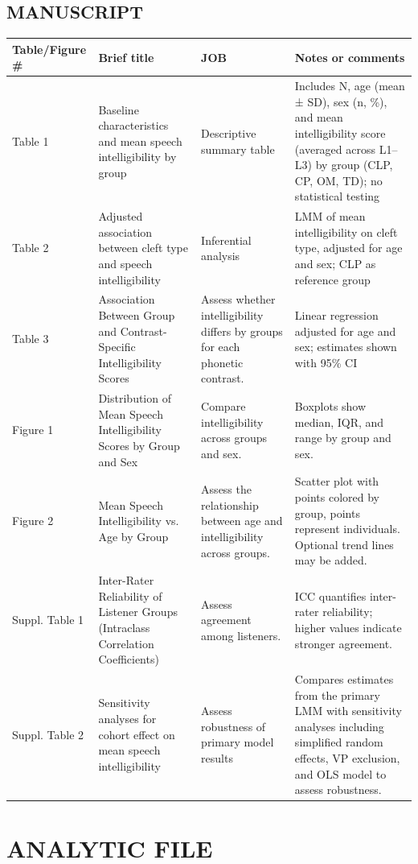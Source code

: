 \documentclass{article}
\begin{document}
\subsection*{MANUSCRIPT}

\begin{tabular}{p{2.5cm} p{4cm} p{2.5cm} p{5cm}}
\toprule
\textbf{Table/Figure \#} & \textbf{Brief title} & \textbf{JOB} & \textbf{Notes or comments} \\
\midrule
Table 1 & Baseline characteristics and mean speech intelligibility by group& Descriptive summary table& Includes N, age (mean ± SD), sex (n, \%), and mean intelligibility score (averaged across L1–L3) by group (CLP, CP, OM, TD); no statistical testing\\[1em]
Table 2 & Adjusted association between cleft type and speech intelligibility& Inferential analysis& LMM of mean intelligibility on cleft type, adjusted for age and sex; CLP as reference group\\[1em]
Table 3 & Association Between Group and Contrast-Specific Intelligibility Scores&Assess whether intelligibility differs by groups for each phonetic contrast. &Linear regression adjusted for age and sex; estimates shown with 95\% CI \\[1em]
Figure 1 & Distribution of Mean Speech Intelligibility Scores by Group and Sex& Compare intelligibility across groups and sex.& Boxplots show median, IQR, and range by group and sex.\\[1em]
 Figure 2& Mean Speech Intelligibility vs. Age by Group & Assess the relationship between age and intelligibility across groups. &Scatter plot with points colored by group, points represent individuals. Optional trend lines may be added. \\[1em]
Suppl. Table 1 & Inter-Rater Reliability of Listener Groups (Intraclass Correlation Coefficients)& Assess agreement among listeners.& ICC quantifies inter-rater reliability; higher values indicate stronger agreement.\\[1em]
Suppl. Table 2 &Sensitivity analyses for cohort effect on mean speech intelligibility & Assess robustness of primary model results& Compares estimates from the primary LMM with sensitivity analyses including simplified random effects, VP exclusion, and OLS model to assess robustness.\\
\bottomrule
\end{tabular}

\section*{ANALYTIC FILE}\label{sec:analytic}
\end{document}
